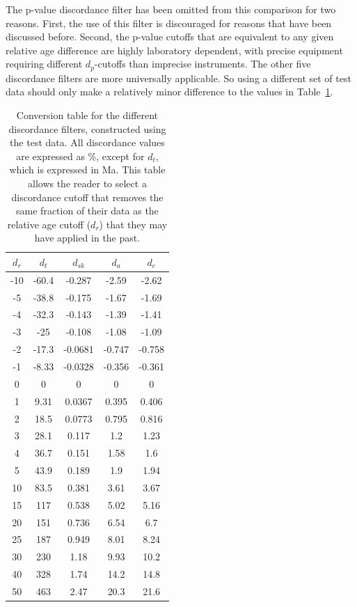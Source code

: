 \documentclass[gchron, manuscript]{copernicus}
\begin{document}
The p-value discordance filter has been omitted from this comparison
for two reasons. First, the use of this filter is discouraged for
reasons that have been discussed before. Second, the p-value cutoffs
that are equivalent to any given relative age difference are highly
laboratory dependent, with precise equipment requiring different
$d_p$-cutoffs than imprecise instruments. The other five discordance
filters are more universally applicable. So using a different set of
test data should only make a relatively minor difference to the values
in Table~\ref{tab:conversiontable}.

\begin{table}
  \begin{tabular}{c|cccc}
    $d_r$ & $d_t$ & $d_{sk}$ & $d_a$ & $d_c$ \\ \hline
    -10 & -60.4 & -0.287 & -2.59 & -2.62 \\
    -5 & -38.8 & -0.175 & -1.67 & -1.69 \\
    -4 & -32.3 & -0.143 & -1.39 & -1.41 \\
    -3 & -25 & -0.108 & -1.08 & -1.09 \\
    -2 & -17.3 & -0.0681 & -0.747 & -0.758 \\
    -1 & -8.33 & -0.0328 & -0.356 & -0.361 \\
    0 & 0 & 0 & 0 & 0 \\
    1 & 9.31 & 0.0367 & 0.395 & 0.406 \\
    2 & 18.5 & 0.0773 & 0.795 & 0.816 \\
    3 & 28.1 & 0.117 & 1.2 & 1.23 \\
    4 & 36.7 & 0.151 & 1.58 & 1.6 \\
    5 & 43.9 & 0.189 & 1.9 & 1.94 \\
    10 & 83.5 & 0.381 & 3.61 & 3.67 \\
    15 & 117 & 0.538 & 5.02 & 5.16 \\
    20 & 151 & 0.736 & 6.54 & 6.7 \\
    25 & 187 & 0.949 & 8.01 & 8.24 \\
    30 & 230 & 1.18 & 9.93 & 10.2 \\
    40 & 328 & 1.74 & 14.2 & 14.8 \\
    50 & 463 & 2.47 & 20.3 & 21.6
  \end{tabular}
  \caption{Conversion table for the different discordance filters,
    constructed using the test data. All discordance values are
    expressed as \%, except for $d_t$, which is expressed in Ma. This
    table allows the reader to select a discordance cutoff that
    removes the same fraction of their data as the relative age cutoff
    ($d_r$) that they may have applied in the past. }
  \label{tab:conversiontable}
\end{table}
\end{document}
